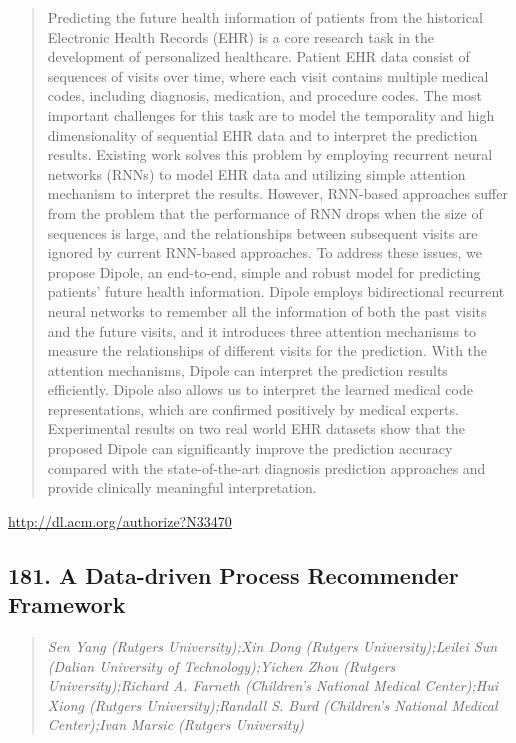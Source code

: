 \documentclass{article}
\begin{document}
\begin{quote}
Predicting the future health information of patients from the historical Electronic Health Records (EHR) is a core research task in the development of personalized healthcare. Patient EHR data consist of sequences of visits over time, where each visit contains multiple medical codes, including diagnosis, medication, and procedure codes. The most important challenges for this task are to model the temporality and high dimensionality of sequential EHR data and to interpret the prediction results. Existing work solves this problem by employing recurrent neural networks (RNNs) to model EHR data and utilizing simple attention mechanism to interpret the results. However, RNN-based approaches suffer from the problem that the performance of RNN drops when the size of sequences is large, and the relationships between subsequent visits are ignored by current RNN-based approaches. To address these issues, we propose Dipole, an end-to-end, simple and robust model for predicting patients’ future health information. Dipole employs bidirectional recurrent neural networks to remember all the information of both the past visits and the future visits, and it introduces three attention mechanisms to measure the relationships of different visits for the prediction. With the attention mechanisms, Dipole can interpret the prediction results efficiently. Dipole also allows us to interpret the learned medical code representations, which are confirmed positively by medical experts. Experimental results on two real world EHR datasets show that the proposed Dipole can significantly improve the prediction accuracy compared with the state-of-the-art diagnosis prediction approaches and provide clinically meaningful interpretation.
\end{quote}

\href{http://dl.acm.org/authorize?N33470}{http://dl.acm.org/authorize?N33470}

\subsection{181. A Data-driven Process Recommender Framework}

\begin{quote}
\footnotesize{\textit{Sen Yang (Rutgers University);Xin Dong (Rutgers University);Leilei Sun (Dalian University of Technology);Yichen Zhou (Rutgers University);Richard A. Farneth (Children's National Medical Center);Hui Xiong (Rutgers University);Randall S. Burd (Children's National Medical Center);Ivan Marsic (Rutgers University)}}

\end{quote}
\end{document}
